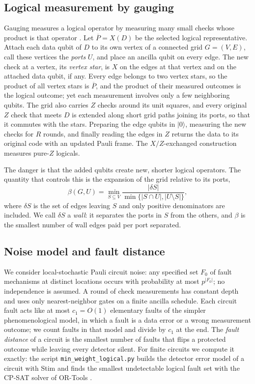 \documentclass[10pt,a4paper,twocolumn]{article}
\begin{document}
\subsection{Logical measurement by gauging}
\label{sec:gauging}
Gauging measures a logical operator by measuring many small checks whose
product is that operator \cite{WilliamsonYoderGauging}.  Let $\overline P=X(D)$
be the selected logical representative.  Attach each data qubit of $D$ to its
own vertex of a connected grid $G=(V,E)$, call these vertices the \emph{ports}
$U$, and place an ancilla qubit on every edge.  The new check at a vertex, its
\emph{vertex star}, is $X$ on the edges at that vertex and on the attached data
qubit, if any.  Every edge belongs to two vertex stars, so the product of all
vertex stars is $\overline P$, and the product of their measured outcomes is the
logical outcome; yet each measurement involves only a few neighboring qubits.
The grid also carries $Z$ checks around its unit squares, and every original $Z$
check that meets $D$ is extended along short grid paths joining its ports, so
that it commutes with the stars.  Preparing the edge qubits in $|0\rangle$,
measuring the new checks for $R$ rounds, and finally reading the edges in $Z$
returns the data to its original code with an updated Pauli frame.  The
$X/Z$-exchanged construction measures pure-$Z$ logicals.

The danger is that the added qubits create new, shorter logical operators.  The
quantity that controls this is the expansion of the grid relative to its ports,
\begin{equation}
 \beta(G,U)=\min_{S\subseteq V}
 \frac{|\delta S|}{\min\{|S\cap U|,|U\setminus S|\}},
 \label{eq:beta}
\end{equation}
where $\delta S$ is the set of edges leaving $S$ and only positive denominators
are included.  We call $\delta S$ a \emph{wall}: it separates the ports in $S$
from the others, and $\beta$ is the smallest number of wall edges paid per port
separated.

\subsection{Noise model and fault distance}
\label{sec:noise}
We consider local-stochastic Pauli circuit noise: any specified set $F_0$ of
fault mechanisms at distinct locations occurs with probability at most
$p^{|F_0|}$; no independence is assumed.  A round of check measurements has
constant depth and uses only nearest-neighbor gates on a finite ancilla
schedule.  Each circuit fault acts like at most $c_1=O(1)$ elementary faults of
the simpler phenomenological model, in which a fault is a data error or a wrong
measurement outcome; we count faults in that model and divide by $c_1$ at the
end.  The \emph{fault distance} of a circuit is the smallest number of faults
that flips a protected outcome while leaving every detector silent.  For finite
circuits we compute it exactly: the script \texttt{min\_weight\_logical.py}
builds the detector error model of a circuit with Stim \cite{Stim} and finds the
smallest undetectable logical fault set with the CP-SAT solver of OR-Tools
\cite{CPSAT}.
\end{document}

